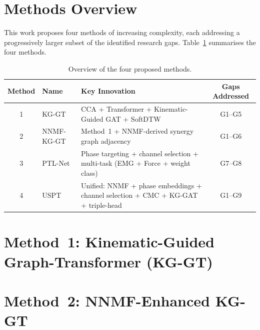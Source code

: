 \documentclass[12pt, a4paper]{article}
\begin{document}
	\newpage
	
	\section{Methods Overview}
	
	This work proposes four methods of increasing complexity, each addressing
	a progressively larger subset of the identified research gaps. Table~\ref{tab:methods_overview}
	summarises the four methods.
	
	\begin{table}[H]
		\centering
		\caption{Overview of the four proposed methods.}
		\label{tab:methods_overview}
		\renewcommand{\arraystretch}{1.4}
		\begin{tabular}{clp{5.5cm}c}
			\toprule
			\textbf{Method} & \textbf{Name} & \textbf{Key Innovation} & \textbf{Gaps Addressed} \\
			\midrule
			1 & KG-GT &
			CCA + Transformer + Kinematic-Guided GAT + SoftDTW &
			G1--G5 \\
			2 & NNMF-KG-GT &
			Method~1 + NNMF-derived synergy graph adjacency &
			G1--G6 \\
			3 & PTL-Net &
			Phase targeting + channel selection + multi-task (EMG + Force + weight class) &
			G7--G8 \\
			4 & USPT &
			Unified: NNMF + phase embeddings + channel selection + CMC + KG-GAT + triple-head &
			G1--G9 \\
			\bottomrule
		\end{tabular}
	\end{table}
	
	\section{Method~1: Kinematic-Guided Graph-Transformer (KG-GT)}
	\label{sec:method1}
	
	
	
	\newpage
	
	\section{Method~2: NNMF-Enhanced KG-GT}
	\label{sec:method2}
	
\end{document}
